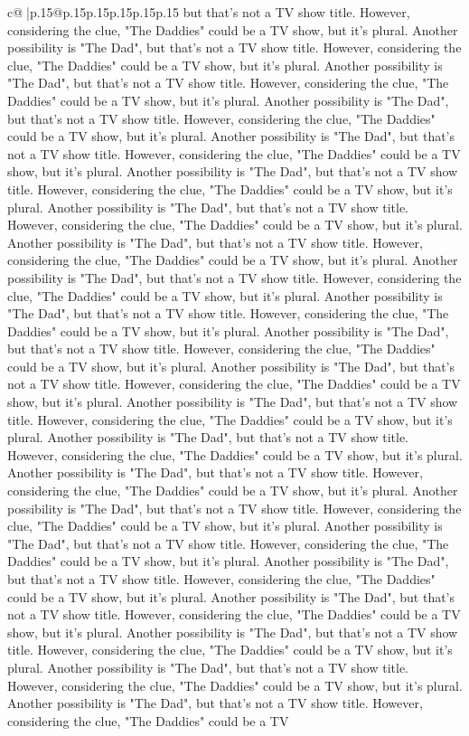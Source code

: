 \documentclass{article}
\begin{document}
{\begin{supertabular}{c@{$\;$}|p{.15\linewidth}@{}p{.15\linewidth}p{.15\linewidth}p{.15\linewidth}p{.15\linewidth}p{.15\linewidth}}
{{{but that's not a TV show title. However, considering the clue, "The Daddies" could be a TV show, but it's plural. Another possibility is "The Dad", but that's not a TV show title. However, considering the clue, "The Daddies" could be a TV show, but it's plural. Another possibility is "The Dad", but that's not a TV show title. However, considering the clue, "The Daddies" could be a TV show, but it's plural. Another possibility is "The Dad", but that's not a TV show title. However, considering the clue, "The Daddies" could be a TV show, but it's plural. Another possibility is "The Dad", but that's not a TV show title. However, considering the clue, "The Daddies" could be a TV show, but it's plural. Another possibility is "The Dad", but that's not a TV show title. However, considering the clue, "The Daddies" could be a TV show, but it's plural. Another possibility is "The Dad", but that's not a TV show title. However, considering the clue, "The Daddies" could be a TV show, but it's plural. Another possibility is "The Dad", but that's not a TV show title. However, considering the clue, "The Daddies" could be a TV show, but it's plural. Another possibility is "The Dad", but that's not a TV show title. However, considering the clue, "The Daddies" could be a TV show, but it's plural. Another possibility is "The Dad", but that's not a TV show title. However, considering the clue, "The Daddies" could be a TV show, but it's plural. Another possibility is "The Dad", but that's not a TV show title. However, considering the clue, "The Daddies" could be a TV show, but it's plural. Another possibility is "The Dad", but that's not a TV show title. However, considering the clue, "The Daddies" could be a TV show, but it's plural. Another possibility is "The Dad", but that's not a TV show title. However, considering the clue, "The Daddies" could be a TV show, but it's plural. Another possibility is "The Dad", but that's not a TV show title. However, considering the clue, "The Daddies" could be a TV show, but it's plural. Another possibility is "The Dad", but that's not a TV show title. However, considering the clue, "The Daddies" could be a TV show, but it's plural. Another possibility is "The Dad", but that's not a TV show title. However, considering the clue, "The Daddies" could be a TV show, but it's plural. Another possibility is "The Dad", but that's not a TV show title. However, considering the clue, "The Daddies" could be a TV show, but it's plural. Another possibility is "The Dad", but that's not a TV show title. However, considering the clue, "The Daddies" could be a TV show, but it's plural. Another possibility is "The Dad", but that's not a TV show title. However, considering the clue, "The Daddies" could be a TV show, but it's plural. Another possibility is "The Dad", but that's not a TV show title. However, considering the clue, "The Daddies" could be a TV show, but it's plural. Another possibility is "The Dad", but that's not a TV show title. However, considering the clue, "The Daddies" could be a TV show, but it's plural. Another possibility is "The Dad", but that's not a TV show title. However, considering the clue, "The Daddies" could be a TV }}}
\end{supertabular}}
\end{document}

